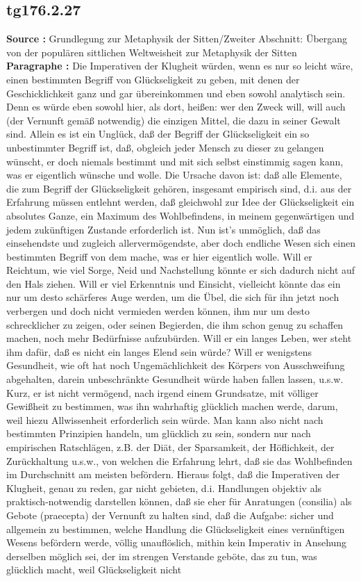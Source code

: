 \documentclass[a4paper,12pt,twoside]{book}
\begin{document}
	\subsection*{tg176.2.27} 
	\textbf{Source : }Grundlegung zur Metaphysik der Sitten/Zweiter Abschnitt: Übergang von der populären sittlichen Weltweisheit zur Metaphysik der Sitten\\  
	
	\noindent\textbf{Paragraphe : }Die Imperativen der Klugheit würden, wenn es nur so leicht wäre, einen bestimmten Begriff von Glückseligkeit zu geben, mit denen der Geschicklichkeit ganz und gar übereinkommen und eben sowohl analytisch sein. Denn es würde eben sowohl hier, als dort, heißen: wer den Zweck will, will auch (der Vernunft gemäß notwendig) die einzigen Mittel, die dazu in seiner Gewalt sind. Allein es ist ein Unglück, daß der Begriff der Glückseligkeit ein so unbestimmter Begriff ist, daß, obgleich jeder Mensch zu dieser zu gelangen wünscht, er doch niemals bestimmt und mit sich selbst einstimmig sagen kann, was er eigentlich wünsche und wolle. Die Ursache davon ist: daß alle Elemente, die zum Begriff der Glückseligkeit gehören, insgesamt empirisch sind, d.i. aus der Erfahrung müssen entlehnt werden, daß gleichwohl zur Idee der Glückseligkeit ein absolutes Ganze, ein Maximum des Wohlbefindens, in meinem gegenwärtigen und jedem zukünftigen Zustande erforderlich ist. Nun ist's unmöglich, daß das einsehendste und zugleich allervermögendste, aber doch endliche Wesen sich einen bestimmten Begriff von dem mache, was er hier eigentlich wolle. Will er Reichtum, wie viel Sorge, Neid und Nachstellung könnte er sich dadurch nicht auf den Hals ziehen. Will er viel Erkenntnis und Einsicht, vielleicht könnte das ein nur um desto schärferes Auge werden, um die Übel, die sich für ihn jetzt noch verbergen und doch nicht vermieden werden können, ihm nur  um desto schrecklicher zu zeigen, oder seinen Begierden, die ihm schon genug zu schaffen machen, noch mehr Bedürfnisse aufzubürden. Will er ein langes Leben, wer steht ihm dafür, daß es nicht ein langes Elend sein würde? Will er wenigstens Gesundheit, wie oft hat noch Ungemächlichkeit des Körpers von Ausschweifung abgehalten, darein unbeschränkte Gesundheit würde haben fallen lassen, u.s.w. Kurz, er ist nicht vermögend, nach irgend einem Grundsatze, mit völliger Gewißheit zu bestimmen, was ihn wahrhaftig glücklich machen werde, darum, weil hiezu Allwissenheit erforderlich sein würde. Man kann also nicht nach bestimmten Prinzipien handeln, um glücklich zu sein, sondern nur nach empirischen Ratschlägen, z.B. der Diät, der Sparsamkeit, der Höflichkeit, der Zurückhaltung u.s.w., von welchen die Erfahrung lehrt, daß sie das Wohlbefinden im Durchschnitt am meisten befördern. Hieraus folgt, daß die Imperativen der Klugheit, genau zu reden, gar nicht gebieten, d.i. Handlungen objektiv als praktisch-notwendig darstellen können, daß sie eher für Anratungen (consilia) als Gebote (praecepta) der Vernunft zu halten sind, daß die Aufgabe: sicher und allgemein zu bestimmen, welche Handlung die Glückseligkeit eines vernünftigen Wesens befördern werde, völlig unauflöslich, mithin kein Imperativ in Ansehung derselben möglich sei, der im strengen Verstande geböte, das zu tun, was glücklich macht, weil Glückseligkeit nicht 
\end{document}
